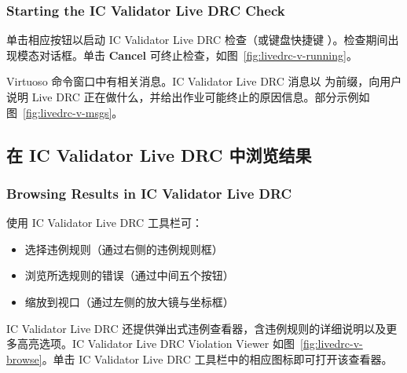 \subsubsection*{Starting the IC Validator Live DRC Check}

单击相应按钮以启动 IC Validator Live DRC 检查（或键盘快捷键 ）。检查期间出现模态对话框。单击 \textbf{Cancel} 可终止检查，如图~\ref{fig:livedrc-v-running}。


Virtuoso 命令窗口中有相关消息。IC Validator Live DRC 消息以  为前缀，向用户说明 Live DRC 正在做什么，并给出作业可能终止的原因信息。部分示例如图~\ref{fig:livedrc-v-msgs}。


\subsection{在 IC Validator Live DRC 中浏览结果}
\subsubsection*{Browsing Results in IC Validator Live DRC}

使用 IC Validator Live DRC 工具栏可：
\begin{itemize}
  \item 选择违例规则（通过右侧的违例规则框）
  \item 浏览所选规则的错误（通过中间五个按钮）
  \item 缩放到视口（通过左侧的放大镜与坐标框）
\end{itemize}


IC Validator Live DRC 还提供弹出式违例查看器，含违例规则的详细说明以及更多高亮选项。IC Validator Live DRC Violation Viewer 如图~\ref{fig:livedrc-v-browse}。单击 IC Validator Live DRC 工具栏中的相应图标即可打开该查看器。


